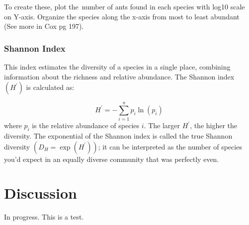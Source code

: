 \documentclass[]{book}
\begin{document}
To create these, plot the~number of ants found in each species with
log10 scale on Y-axis. Organize the species along the x-axis from most
to least abundant (See more in Cox pg 197).

\subsubsection{Shannon Index}\label{shannon-index}

This index estimates the diversity of a species in a single place,
combining information about the richness and relative abundance. The
Shannon index \((H^\prime)\) is calculated as:

\[H^{\prime} = -\sum_{i=1}^n p_i \ln(p_i)\] where \(p_i\) is the
relative abundance of species \(i\). The larger \(H^{\prime}\), the
higher the diversity. The exponential of the Shannon index is called the
true Shannon diversity \((D_H = \exp(H^\prime))\); it can be interpreted
as the number of species you'd expect in an equally diverse community
that was perfectly even.

\section{Discussion}\label{discussion-3}

In progress. This is a test.


\end{document}
